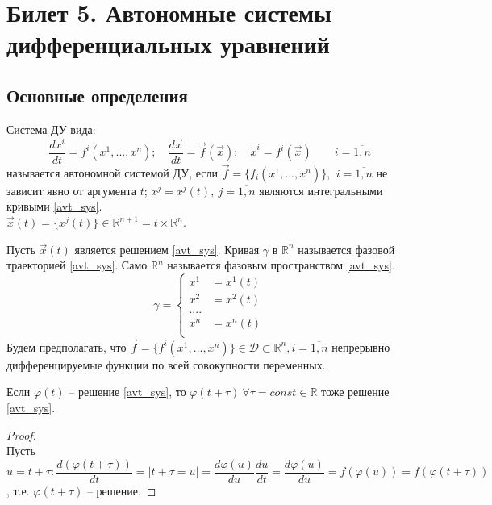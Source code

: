 
\section{Билет 5. Автономные системы дифференциальных уравнений}

\subsection{Основные определения}
Система ДУ вида: 
\begin{equation}\label{avt_sys}
	\frac{dx^i}{dt} = f^i(x^1, ..., x^n); \quad \frac{d\vec{x}}{dt} = \vec{f}(\vec{x}); \quad 	\dot{x}^i = f^i(\vec{x}) \quad \quad i = \overline{1, n}
\end{equation}
называется автономной системой ДУ, если $ \vec{f} = \{f_i(x^1, ..., x^n)\} $,  $\ i = \overline{1, n}$ не зависит явно от аргумента $ t $; $ x^j = x^j(t), \ j = \overline{1, n} $ являются интегральными кривыми \eqref{avt_sys}. \\ $\vec{x}(t) = \{ x^j(t) \} \in \mathbb{R}^{n+1} = t \times \mathbb{R}^n$.
\begin{definition}
	Пусть $ \vec{x}(t) $ является решением \eqref{avt_sys}. Кривая $ \gamma $ в $ \mathbb{R}^n $ называется фазовой траекторией \eqref{avt_sys}. Само $ \mathbb{R}^n $ называется фазовым пространством \eqref{avt_sys}.
	\begin{equation}\label{gamma_sys}
		\gamma = \left\{
			\begin{aligned}
				x^1 &= x^1(t) \\
				x^2 &=x^2(t) \\
				.... \\
				x^n &= x^n(t) \\
			\end{aligned}
		\right.
	\end{equation}
	Будем предполагать, что $ \vec{f} = \{ f^i(x^1, ..., x^n) \} \in \mathscr{D} \subset \mathbb{R}^n, i = \overline{1, n} $ непрерывно дифференцируемые функции по всей совокупности переменных.
\end{definition}

\begin{theorem}
	Если $ \varphi(t) $ -- решение \eqref{avt_sys}, то $ \varphi(t + \tau) \ \forall \tau = const \in \mathbb{R}$ тоже решение \eqref{avt_sys}.
\end{theorem}

\begin{proof}
	\ \\
	Пусть $ u = t + \tau: \dfrac{d(\varphi(t + \tau))}{dt} = | t + \tau = u | = \dfrac{d \varphi(u)}{du} \dfrac{du}{dt} = \dfrac{d \varphi(u)}{du} = f(\varphi(u)) = f(\varphi(t + \tau))$, т.е. $\varphi(t + \tau)$ -- решение.
\end{proof}

